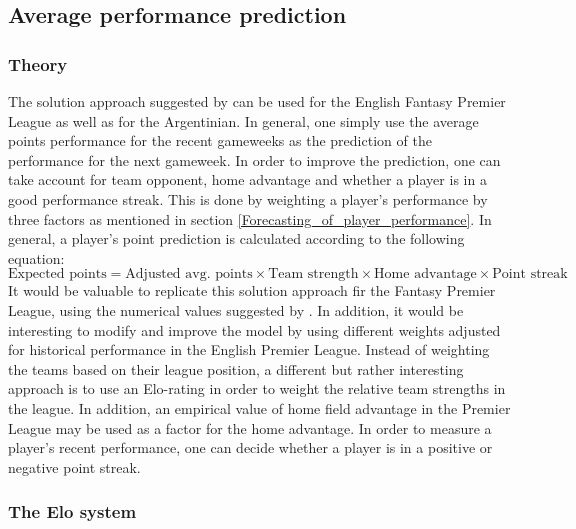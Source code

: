 \subsection{Average performance prediction}
\subsubsection{Theory}
The solution approach suggested by \cite{Bonomo} can be used for the English Fantasy Premier League as well as for the Argentinian. In general, one simply use the average points performance for the recent gameweeks as the prediction of the performance for the next gameweek. In order to improve the prediction, one can take account for team opponent, home advantage and whether a player is in a good performance streak. This is done by weighting a player's performance by three factors as mentioned in section \ref{Forecasting_of_player_performance}.
\newpar
In general, a player's point prediction is calculated according to the following equation:
\begin{equation}
    \textrm{Expected points} = \textrm{Adjusted avg. points} \times \textrm{Team strength} \times \textrm{Home advantage} \times \textrm{Point streak}
\end{equation}
\newpar
It would be valuable to replicate this solution approach fir the Fantasy Premier League, using the numerical values suggested by \cite{Bonomo}. In addition, it would be interesting to modify and improve the model by using different weights adjusted for historical performance in the English Premier League. Instead of weighting the teams based on their league position, a different but rather interesting approach is to use an Elo-rating in order to weight the relative team strengths in the league. In addition, an empirical value of home field advantage in the Premier League may be used as a factor for the home advantage. In order to measure a player's recent performance, one can decide whether a player is in a positive or negative point streak. 
\subsubsection{The Elo system}


